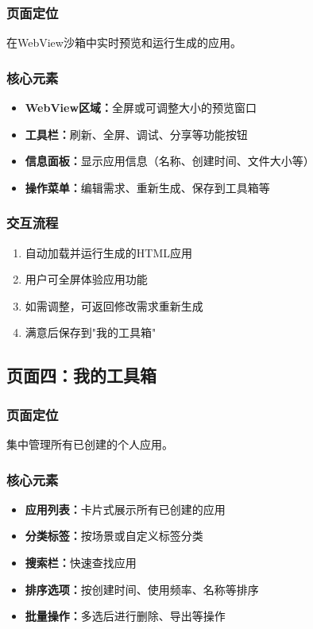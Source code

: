 \documentclass[a4paper,12pt]{ctexart}
\begin{document}
\subsubsection{页面定位}
在WebView沙箱中实时预览和运行生成的应用。

\subsubsection{核心元素}
\begin{itemize}[leftmargin=2em]
    \item \textbf{WebView区域：}全屏或可调整大小的预览窗口
    \item \textbf{工具栏：}刷新、全屏、调试、分享等功能按钮
    \item \textbf{信息面板：}显示应用信息（名称、创建时间、文件大小等）
    \item \textbf{操作菜单：}编辑需求、重新生成、保存到工具箱等
\end{itemize}

\subsubsection{交互流程}
\begin{enumerate}[leftmargin=2em]
    \item 自动加载并运行生成的HTML应用
    \item 用户可全屏体验应用功能
    \item 如需调整，可返回修改需求重新生成
    \item 满意后保存到"我的工具箱"
\end{enumerate}

\subsection{页面四：我的工具箱}

\subsubsection{页面定位}
集中管理所有已创建的个人应用。

\subsubsection{核心元素}
\begin{itemize}[leftmargin=2em]
    \item \textbf{应用列表：}卡片式展示所有已创建的应用
    \item \textbf{分类标签：}按场景或自定义标签分类
    \item \textbf{搜索栏：}快速查找应用
    \item \textbf{排序选项：}按创建时间、使用频率、名称等排序
    \item \textbf{批量操作：}多选后进行删除、导出等操作
\end{itemize}
\end{document}
